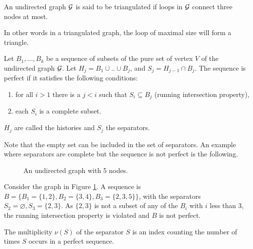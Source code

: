 \begin{definition}
 An undirected graph $\mathcal{G}$ is said to be triangulated if loops in $\mathcal{G}$ connect three nodes at most.
 \end{definition} 
 In other words in a triangulated graph, the loop of maximal size will form a triangle.
 \begin{definition}\label{def:seq}
 Let $B_1,...,B_k$ be a sequence of subsets of the pure set of vertex $V$ of the undirected graph $\mathcal{G}$. Let $H_j=B_1\cup .. \cup B_j$, and $S_j = H_{j-1} \cap B_j$. The sequence is perfect if it satisfies the following conditions:
 \begin{enumerate}[label=(\roman*)]
 \item for all $i>1$ there is a $j<i$ such that $S_i \subseteq B_j$ (running intersection property),
 \item each $S_i$ is a complete subset.
 \end{enumerate}
 $H_j$ are called the histories and $S_j$ the separators.
 \end{definition}
Note that the empty set can be included in the set of separators. An example where separators are complete but the sequence is not perfect is the following.
\begin{figure}[H]
 \begin{center}
 \caption{An undirected graph with 5 nodes.}
  \label{ex:graph1}
    \end{center}
\end{figure}
Consider the graph in Figure \ref{ex:graph1}. A sequence is $B=\big\{B_1=\{1,2\}, B_2=\{3,4\},B_3=\{2,3,5\}\big\}$, with the separators $S_2=\varnothing, S_3=\{2,3\}$. As $\{2,3\}$ is not a subset of any of the $B_i$ with $i$ less than 3, the running intersection property is violated and $B$ is not perfect.
 \begin{definition}
 The multiplicity $\nu (S)$ of the separator $S$ is an index counting the number of times $S$ occurs in a perfect sequence.
 \end{definition}
 
